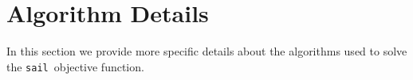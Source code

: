 \documentclass[12pt,letter]{article}\usepackage[]{graphicx}\usepackage[]{color}
\newcommand{\sail}{\texttt{sail}}
\begin{document}



\newpage
%
%



\newpage

\appendix
{}

\section{Algorithm Details} \label{ap:sail_algorithm}

In this section we provide more specific details about the algorithms used to solve the \sail ~objective function.
\end{document}
